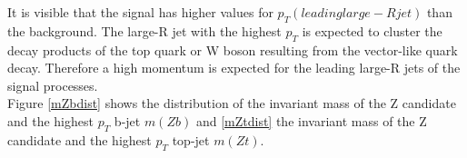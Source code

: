 It is visible that the signal has higher values for $p_{T}(leading large-R jet)$ than the background.
The large-R jet with the highest $p_{T}$ is expected to cluster the decay products of the top quark or W boson resulting from the vector-like quark decay.
Therefore a high momentum is expected for the leading large-R jets of the signal processes.\\
Figure \ref{mZbdist} shows the distribution of the invariant mass of the Z candidate and the highest $p_{T}$ b-jet $m(Zb)$ and \ref{mZtdist} the invariant mass of the Z candidate and the highest $p_{T}$ top-jet $m(Zt)$.


\begin{figure}[h]
    \centering
\end{figure}
